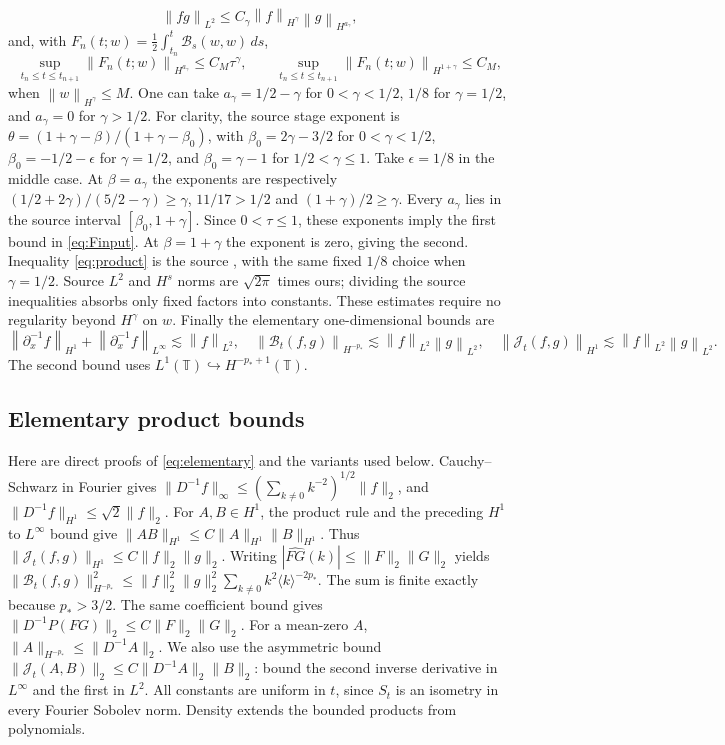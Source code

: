 \documentclass[11pt]{article}
\theoremstyle{remark}\newtheorem{remark}[theorem]{Remark}
\newcommand{\T}{\mathbb T}
\newcommand{\cJ}{\mathcal J}
\newcommand{\cB}{\mathcal B}
\newcommand{\norm}[2][]{\left\lVert #2\right\rVert_{#1}}
\newcommand{\ip}{\partial_x^{-1}}
\begin{document}
\begin{equation}\label{eq:product}
\norm[L^2]{fg}\leq C_\gamma\norm[H^\gamma]{f}\norm[H^{a_\gamma}]{g},
\end{equation}
and, with $F_n(t;w)=\frac12\int_{t_n}^t\cB_s(w,w)\,ds$,
\begin{equation}\label{eq:Finput}
\sup_{t_n\leq t\leq t_{n+1}}
\norm[H^{a_\gamma}]{F_n(t;w)}\leq C_M\tau^\gamma,
\qquad
\sup_{t_n\leq t\leq t_{n+1}}
\norm[H^{1+\gamma}]{F_n(t;w)}\leq C_M,
\end{equation}
when $\norm[H^\gamma]{w}\leq M$. One can take
$a_\gamma=1/2-\gamma$ for $0<\gamma<1/2$, $1/8$
for $\gamma=1/2$, and $a_\gamma=0$ for $\gamma>1/2$.
For clarity, the source stage exponent is
$\theta=(1+\gamma-\beta)/(1+\gamma-\beta_0)$, with
$\beta_0=2\gamma-3/2$ for $0<\gamma<1/2$, $\beta_0=-1/2-\epsilon$
for $\gamma=1/2$, and $\beta_0=\gamma-1$ for $1/2<\gamma\leq1$.
Take $\epsilon=1/8$ in the middle case. At $\beta=a_\gamma$ the exponents
are respectively $(1/2+2\gamma)/(5/2-\gamma)\geq\gamma$, $11/17>1/2$ and
$(1+\gamma)/2\geq\gamma$. Every $a_\gamma$ lies in the source interval
$[\beta_0,1+\gamma]$. Since $0<\tau\leq1$, these exponents imply the
first bound in \eqref{eq:Finput}. At $\beta=1+\gamma$ the exponent is zero,
giving the second. Inequality \eqref{eq:product} is the source
\cite[Eqs.~(2.2)--(2.3)]{LW}, with the same fixed $1/8$ choice when
$\gamma=1/2$. Source $L^2$ and $H^s$ norms are $\sqrt{2\pi}$ times ours;
dividing the source inequalities absorbs only fixed factors into constants.
These estimates require no regularity beyond $H^\gamma$ on $w$.
Finally the elementary one-dimensional bounds are
\begin{equation}\label{eq:elementary}
\norm[H^1]{\ip f}+\norm[L^\infty]{\ip f}\lesssim\norm[L^2]{f},
\quad \norm[H^{-p_*}]{\cB_t(f,g)}\lesssim\norm[L^2]{f}\norm[L^2]{g},
\quad \norm[H^1]{\cJ_t(f,g)}\lesssim\norm[L^2]{f}\norm[L^2]{g}.
\end{equation}
The second bound uses $L^1(\T)\hookrightarrow H^{-p_*+1}(\T)$.

\subsection{Elementary product bounds}
Here are direct proofs of \eqref{eq:elementary} and the variants used below.
Cauchy--Schwarz in Fourier gives
$\|D^{-1}f\|_\infty\leq(\sum_{k\ne0}k^{-2})^{1/2}\|f\|_2$,
and $\|D^{-1}f\|_{H^1}\leq\sqrt2\|f\|_2$.
For $A,B\in H^1$, the product rule and the preceding $H^1$ to $L^\infty$
bound give $\|AB\|_{H^1}\leq C\|A\|_{H^1}\|B\|_{H^1}$.
Thus $\|\cJ_t(f,g)\|_{H^1}\leq C\|f\|_2\|g\|_2$.
Writing $|\widehat{FG}(k)|\leq\|F\|_2\|G\|_2$ yields
$\|\cB_t(f,g)\|_{H^{-p_*}}^2\leq
\|f\|_2^2\|g\|_2^2\sum_{k\ne0}k^2\langle k\rangle^{-2p_*}$.
The sum is finite exactly because $p_*>3/2$.
The same coefficient bound gives
$\|D^{-1}P(FG)\|_2\leq C\|F\|_2\|G\|_2$.
For a mean-zero $A$, $\|A\|_{H^{-p_*}}\leq\|D^{-1}A\|_2$.
We also use the asymmetric bound
$\|\cJ_t(A,B)\|_2\leq C\|D^{-1}A\|_2\|B\|_2$:
bound the second inverse derivative in $L^\infty$ and the first in $L^2$.
All constants are uniform in $t$, since $S_t$ is an isometry in every
Fourier Sobolev norm. Density extends the bounded products from polynomials.
\end{document}
